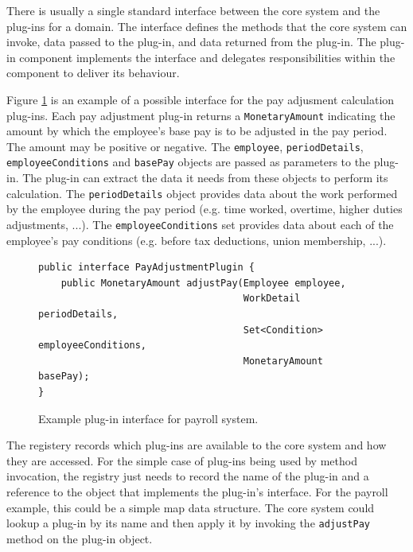 There is usually a single standard interface between the core system and the plug-ins for a domain.
The interface defines the methods that the core system can invoke, data passed to the plug-in, and data returned from the plug-in.
The plug-in component implements the interface and delegates responsibilities within the component to deliver its behaviour.

Figure \ref{fig:interface} is an example of a possible interface for the pay adjusment calculation plug-ins.
Each pay adjustment plug-in returns a \texttt{MonetaryAmount} indicating the amount by which the employee's base pay is to be adjusted in the pay period.
The amount may be positive or negative.
The \texttt{employee}, \texttt{periodDetails}, \texttt{employeeConditions} and \texttt{basePay} objects are passed as parameters to the plug-in.
The plug-in can extract the data it needs from these objects to perform its calculation.
The \texttt{periodDetails} object provides data about the work performed by the employee during the pay period (e.g. time worked, overtime, higher duties adjustments, ...).
The \texttt{employeeConditions} set provides data about each of the employee's pay conditions (e.g. before tax deductions, union membership, ...).

\begin{figure}[ht]{\textwidth}
\centering
\begin{shaded}
\begin{lstlisting}[style=java]
public interface PayAdjustmentPlugin {
    public MonetaryAmount adjustPay(Employee employee,
                                    WorkDetail periodDetails,
                                    Set<Condition> employeeConditions,
                                    MonetaryAmount basePay);
}
\end{lstlisting}
\end{shaded}
\caption{Example plug-in interface for payroll system.}
\label{fig:interface}
\end{figure}

The registery records which plug-ins are available to the core system and how they are accessed.
For the simple case of plug-ins being used by method invocation,
the registry just needs to record the name of the plug-in and a reference to the object that implements the plug-in's interface.
For the payroll example, this could be a simple map data structure.
The core system could lookup a plug-in by its name and then apply it by invoking the \texttt{adjustPay} method on the plug-in object.

